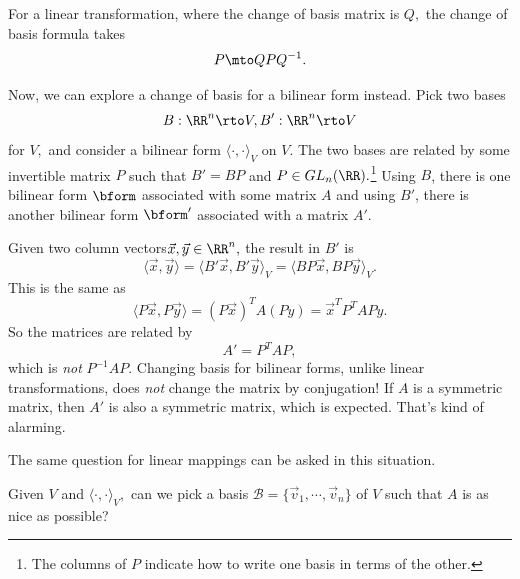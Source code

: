For a linear transformation, where the change of basis matrix is $Q,$ the change of basis formula takes \[P \mto QPQ^{-1}.\]

Now, we can explore a change of basis for a bilinear form instead. Pick two bases \[B: \RR^n \rto V, B': \RR^n \rto V\] for $V,$ and consider a bilinear form $\langle \cdot, \cdot \rangle_V$ on $V.$ The two bases are related by some invertible matrix $P$ such that $B' = BP$ and $P \in GL_n(\RR).$\footnote{The columns of $P$ indicate how to write one basis in terms of the other.} Using $B$, there is one bilinear form $\bform$ associated with some matrix $A$ and using $B'$, there is another bilinear form $\bform'$ associated with a matrix $A'.$

\begin{center}

\end{center}




Given two column vectors$ \vec{x}, \vec{y} \in \RR^n,$ the result in $B'$ is \[\langle \vec{x}, \vec{y} \rangle = \langle B'\vec{x}, B'\vec{y} \rangle_V = \langle BP\vec{x}, BP\vec{y} \rangle_V.\] This is the same as 
\[
\langle P\vec{x}, P\vec{y} \rangle = (P\vec{x})^T A (Py) = \vec{x}^TP^TAPy.
\]
So the matrices are related by \[\boxed{A' = P^TAP},\] which is \emph{not} $P^{-1}AP.$ Changing basis for bilinear forms, unlike linear transformations, does \emph{not} change the matrix by conjugation! If $A$ is a symmetric matrix, then $A'$ is also a symmetric matrix, which is expected. That's kind of alarming.

The same question for linear mappings can be asked in this situation.
\begin{qq}
Given $V$ and $\langle \cdot, \cdot \rangle_V,$ can we pick a basis $\mathcal{B} = \{\vec{v}_1, \cdots, \vec{v}_n\}$ of $V$ such that $A$ is as nice as possible?
\end{qq}

